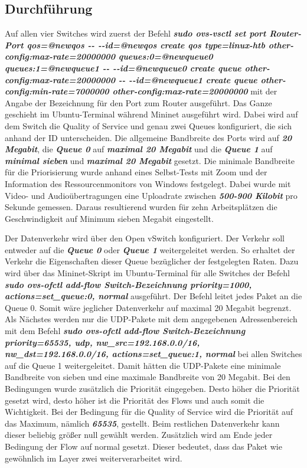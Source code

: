 \documentclass[fontsize=12pt,paper=a4,open=any,parskip=half,
  twoside=false,toc=listof,toc=bibliography,fleqn,leqno,
  captions=nooneline,captions=tableabove,british]{scrbook}
\begin{document}
\subsection{Durchführung}
Auf allen vier Switches wird zuerst der Befehl \textit{\textbf{sudo ovs\hyp{}vsctl set port Router\hyp{}Port qos=@newqos \hyp{}\hyp{} \hyp{}\hyp{}id=@newqos create qos type=linux\hyp{}htb other\hyp{}config:max\hyp{}rate=20000000 queues:0=@newqueue0 queues:1=@newqueue1 \hyp{}\hyp{} \hyp{}\hyp{}id=@newqueue0 create queue other\hyp{}config:max\hyp{}rate=20000000 \hyp{}\hyp{} \hyp{}\hyp{}id=\linebreak{}@newqueue1 create queue other\hyp{}config:min\hyp{}rate=7000000 other\hyp{}config:max\hyp{}rate=20000000}} mit der Angabe der Bezeichnung für den Port zum Router ausgeführt. Das Ganze geschieht im Ubuntu\hyp{}Terminal während Mininet ausgeführt wird. Dabei wird auf dem Switch die Quality of Service und genau zwei Queues konfiguriert, die sich anhand der ID unterscheiden. Die allgemeine Bandbreite des Ports wird auf \textit{\textbf{20 Megabit}}, die \textit{\textbf{Queue 0}} auf \textit{\textbf{maximal 20 Megabit}} und die \textit{\textbf{Queue 1}} auf \textit{\textbf{minimal sieben}} und \textit{\textbf{maximal 20 Megabit}} gesetzt. Die minimale Bandbreite für die Priorisierung wurde anhand eines Selbst\hyp{}Tests mit Zoom und der Information des Ressourcenmonitors von Windows festgelegt. Dabei wurde mit Video\hyp{} und Audioübertragungen eine Uploadrate zwischen \textit{\textbf{500\hyp{}900 Kilobit}} pro Sekunde gemessen. Daraus resultierend wurden für zehn Arbeitsplätzen die Geschwindigkeit auf Minimum sieben Megabit eingestellt.\par
Der Datenverkehr wird über den Open vSwitch konfiguriert. Der Verkehr soll entweder auf die \textit{\textbf{Queue 0}} oder \textit{\textbf{Queue 1}} weitergeleitet werden. So erhaltet der Verkehr die Eigenschaften dieser Queue bezüglicher der festgelegten Raten. Dazu wird über das Mininet-Skript im Ubuntu-Terminal für alle Switches der Befehl \textit{\textbf{sudo ovs-ofctl add-flow Switch-Bezeichnung priority=1000, actions=set\_queue:0, normal}} ausgeführt. Der Befehl leitet jedes Paket an die Queue 0. Somit wäre jeglicher Datenverkehr auf maximal 20 Megabit begrenzt. Als Nächstes werden nur die UDP-Pakete mit dem angegebenen Adressenbereich mit dem Befehl \textit{\textbf{sudo ovs-ofctl add-flow Switch-Bezeichnung priority=65535, udp, nw\_src=192.168.0.0/16, nw\_dst=192.168.0.0/16, actions=set\_queue:1, normal}} bei allen Switches auf die Queue 1 weitergeleitet. Damit hätten die UDP-Pakete eine minimale Bandbreite von sieben und eine maximale Bandbreite von 20 Megabit. Bei den Bedingungen wurde zusätzlich die Priorität eingegeben. Desto höher die Priorität gesetzt wird, desto höher ist die Priorität des Flows und auch somit die Wichtigkeit. Bei der Bedingung für die Quality of Service wird die Priorität auf das Maximum, nämlich \textit{\textbf{65535}}, gestellt. Beim restlichen Datenverkehr kann dieser beliebig größer null gewählt werden. Zusätzlich wird am Ende jeder Bedingung der Flow auf normal gesetzt. Dieser bedeutet, dass das Paket wie gewöhnlich im Layer zwei weiterverarbeitet wird.
\end{document}
